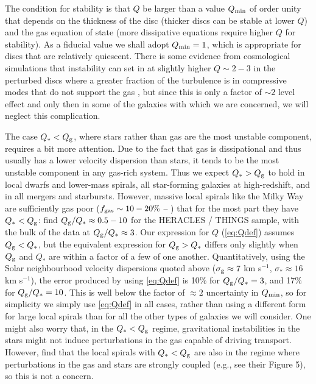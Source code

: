 \documentclass[useAMS,usenatbib]{mn2e}
\begin{document}
The condition for stability is that $Q$ be larger than a value $Q_{\rm min}$ of order unity that depends on the thickness of the disc (thicker discs can be stable at lower $Q$) and the gas equation of state (more dissipative equations require higher $Q$ for stability). As a fiducial value we shall adopt $Q_{\rm min} = 1$, which is appropriate for discs that are relatively quiescent. There is some evidence from cosmological simulations that instability can set in at slightly higher $Q \sim 2 - 3$ in the perturbed discs where a greater fraction of the turbulence is in compressive modes that do not support the gas \citep{inoue16a}, but since this is only a factor of $\sim 2$ level effect and only then in some of the galaxies with which we are concerned, we will neglect this complication.

The case $Q_* < Q_{\rm g}$, where stars rather than gas are the most unstable component, requires a bit more attention. Due to the fact that gas is dissipational and thus usually has a lower velocity dispersion than stars, it tends to be the most unstable component in any gas-rich system. Thus we expect $Q_* > Q_{\rm g}$ to hold in local dwarfs and lower-mass spirals, all star-forming galaxies at high-redshift, and in all mergers and starbursts. However, massive local spirals like the Milky Way are sufficiently gas poor ($f_{\rm gas} \sim 10-20\%$ -- \citealt{saintonge11a}) that for the most part they have $Q_* < Q_{\rm g}$:  \citet{romeo17a} find $Q_{\rm g}/Q_* \approx 0.5-10$ for the HERACLES / THINGS sample, with the bulk of the data at $Q_{\rm g}/Q_* \approx 3$. Our expression for $Q$ (\autoref{eq:Qdef}) assumes $Q_{\rm g} < Q_*$, but the equivalent expression for $Q_{\rm g} > Q_*$ \citep{romeo13a} differs only slightly when $Q_{\rm g}$ and $Q_*$ are within a factor of a few of one another. Quantitatively, using the Solar neighbourhood velocity dispersions quoted above ($\sigma_{\rm g} \approx 7$ km s$^{-1}$, $\sigma_* \approx 16$ km s$^{-1}$), the error produced by using \autoref{eq:Qdef} is 10\% for $Q_{\rm g}/Q_* = 3$, and 17\% for $Q_{\rm g}/Q_* = 10$. This is well below the factor of $\approx 2$ uncertainty in $Q_{\rm min}$, so for simplicity we simply use \autoref{eq:Qdef} in all cases, rather than using a different form for large local spirals than for all the other types of galaxies we will consider. One might also worry that, in the $Q_* < Q_{\rm g}$ regime, gravitational instabilities in the stars might not induce perturbations in the gas capable of driving transport. However, \citet{romeo17a} find that the local spirals with $Q_* < Q_{\rm g}$ are also in the regime where perturbations in the gas and stars are strongly coupled (e.g., see their Figure 5), so this is not a concern.
\end{document}
